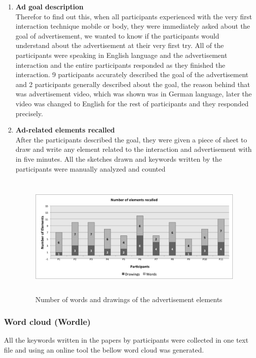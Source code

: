 \begin{enumerate}

\item	\textbf{Ad goal description} \\
Therefor to find out this, when all participants experienced with the very first interaction technique mobile or body, they were immediately asked about the goal of advertisement, we wanted to know if the participants would understand about the advertisement at their very first try. All of the participants were speaking in English language and the advertisement interaction and the entire participants responded as they finished the interaction. 9 participants accurately described the goal of the advertisement and 2 participants generally described about the goal, the reason behind that was advertisement video, which was shown was in German language, later the video was changed to English for the rest of participants and they responded precisely.

\item	\textbf{Ad-related elements recalled}  \\ 
After the participants described the goal, they were given a piece of sheet to draw and write any element related to the interaction and advertisement with in five minutes. All the sketches drawn and keywords written by the participants were manually analyzed and counted

\begin{figure}[H]
\centering
\includegraphics[width=12cm,height=6cm]{Figures/6/word_recall}%
 \caption{Number of words and drawings of the advertisement elements }%
 \label{fig:word_recall}%
\end{figure}

\end{enumerate}

\subsubsection{Word cloud (Wordle)}
All the keywords written in the papers by participants were collected in one text file and using an online tool \cite{wordle} the bellow word cloud was generated.

